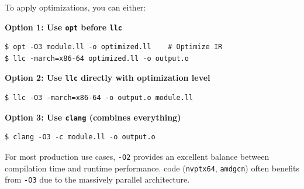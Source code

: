 To apply optimizations, you can either:

\textbf{Option 1: Use \texttt{opt} before \texttt{llc}}
\begin{lstlisting}[style=ir]
$ opt -O3 module.ll -o optimized.ll    # Optimize IR
$ llc -march=x86-64 optimized.ll -o output.o
\end{lstlisting}

\textbf{Option 2: Use \texttt{llc} directly with optimization level}
\begin{lstlisting}[style=ir]
$ llc -O3 -march=x86-64 -o output.o module.ll
\end{lstlisting}

\textbf{Option 3: Use \texttt{clang} (combines everything)}
\begin{lstlisting}[style=ir]
$ clang -O3 -c module.ll -o output.o
\end{lstlisting}

For most production use cases, \texttt{-O2} provides an excellent balance between compilation time and runtime performance.  code (\texttt{nvptx64}, \texttt{amdgcn}) often benefits from \texttt{-O3} due to the massively parallel architecture.
